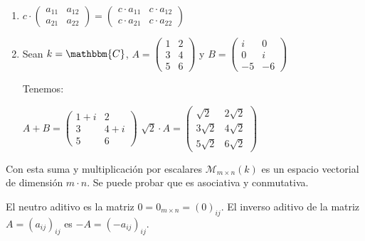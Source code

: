 \documentclass[12pt]{article}
\begin{document}
\begin{description}
\begin{enumerate}
\item
\begin{math}
c \cdot
\begin{pmatrix}
a_{11} & a_{12} \\
a_{21} & a_{22}
\end{pmatrix}
=
\begin{pmatrix}
c \cdot a_{11} & c \cdot a_{12} \\
c \cdot a_{21} & c \cdot a_{22}
\end{pmatrix}
\end{math}

\item
Sean $k = \mathbbm{C}$, 
\begin{math}
A = 
\begin{pmatrix}
1 & 2 \\
3 & 4 \\
5 & 6
\end{pmatrix}
\end{math}
 y 
\begin{math}
B = 
\begin{pmatrix}
i & 0 \\
0 & i \\
-5 & -6
\end{pmatrix}
\end{math}

Tenemos:

\begin{math}
A + B = 
\begin{pmatrix}
1 + i & 2 \\
3 & 4 + i \\
5 & 6
\end{pmatrix}
\end{math}
\begin{math}
\sqrt{2} \cdot A = 
\begin{pmatrix}
\sqrt{2} & 2 \sqrt{2}   \\
3 \sqrt{2} & 4 \sqrt{2} \\
5 \sqrt{2} & 6 \sqrt{2}
\end{pmatrix}
\end{math}
\end{enumerate}

Con esta suma y multiplicación por escalares $\mathcal{M}_{m \times n}(k)$ es un espacio vectorial de dimensión $m \cdot n$. Se puede probar que es asociativa y conmutativa. 

El neutro aditivo es la matriz $0 = 0_{m \times n} = (0)_{ij}$. El inverso aditivo de la matriz $A = (a_{ij})_{ij}$ es $-A = (-a_{ij})_{ij}$.


\end{description}
\end{document}
